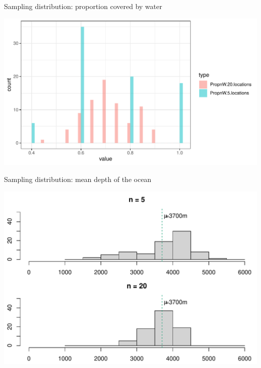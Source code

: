 \documentclass[10pt,handout]{beamer}\usepackage[]{graphicx}\usepackage[]{color}
\makeatletter
\def\maxwidth{ %
  \ifdim\Gin@nat@width>\linewidth
    \linewidth
  \else
    \Gin@nat@width
  \fi
}
\newenvironment{knitrout}{}{} %
\makeatother
\begin{document}
\begin{frame}[fragile]{Sampling distribution: proportion covered by water}
	

	
	
\begin{knitrout}\tiny
{}\color{fgcolor}

{\centering \includegraphics[width=\maxwidth]{figure/unnamed-chunk-3-1} 

}



\end{knitrout}
	
\end{frame}



\begin{frame}[fragile]{Sampling distribution: mean depth of the ocean}
	
	
\begin{knitrout}\tiny
{}\color{fgcolor}

{\centering \includegraphics[width=\maxwidth]{figure/unnamed-chunk-4-1} 

}



\end{knitrout}
	
\end{frame}
\end{document}
